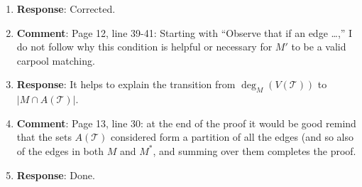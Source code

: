 \documentclass[11pt]{article}
\begin{document}
\begin{enumerate}
\item[] \textbf{Response}: Corrected.

\item \textbf{Comment}: Page 12, line 39-41: Starting with ``Observe
  that if an edge \ldots,'' I do not follow why this condition is
  helpful or necessary for $M'$ to be a valid carpool matching.

\item[] \textbf{Response}: It helps to explain the transition from
  $\deg_M(V(\mathcal{T}))$ to $|M \cap A(\mathcal{T})|$.

\item \textbf{Comment}: Page 13, line 30: at the end of the proof it
  would be good remind that the sets $A(\mathcal{T})$ considered form
  a partition of all the edges (and so also of the edges in both $M$
  and $M^*$, and summing over them completes the proof.

\item[] \textbf{Response}: Done.

\end{enumerate}
\end{document}
